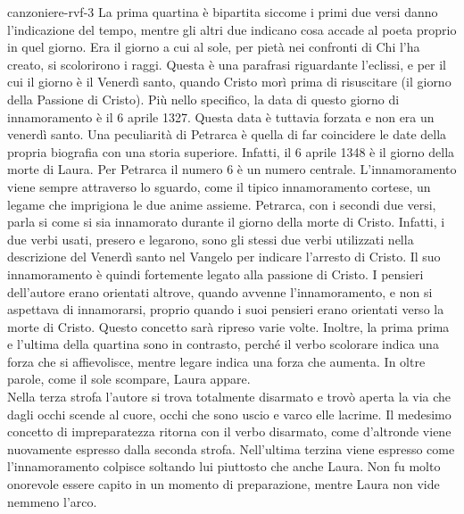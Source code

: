 \documentclass[preview]{standalone}
\begin{document}
\begin{snippet}{canzoniere-rvf-3}
    La prima quartina è bipartita siccome i primi due versi danno l'indicazione del tempo,
    mentre gli altri due indicano cosa accade al poeta proprio in quel giorno.
    Era il giorno a cui al sole, per pietà nei confronti di Chi l'ha creato, si scolorirono i raggi.
    Questa è una parafrasi riguardante l'eclissi, e per il cui il giorno è il Venerdì santo, quando
    Cristo morì prima di risuscitare (il giorno della Passione di Cristo).
    Più nello specifico, la data di questo giorno di innamoramento è il 6 aprile 1327.
    Questa data è tuttavia forzata e non era un venerdì santo.
    Una peculiarità di Petrarca è quella di far coincidere le date della propria biografia
    con una storia superiore. Infatti, il 6 aprile 1348 è il giorno della morte di Laura.
    Per Petrarca il numero 6 è un numero centrale.
    L'innamoramento viene sempre attraverso lo sguardo, come il tipico innamoramento cortese,
    un legame che imprigiona le due anime assieme.
    Petrarca, con i secondi due versi, parla si come si sia innamorato durante il giorno della morte di Cristo.
    Infatti, i due verbi usati, presero e legarono, sono gli stessi due verbi utilizzati nella descrizione
    del Venerdì santo nel Vangelo per indicare l'arresto di Cristo.
    Il suo innamoramento è quindi fortemente legato alla passione di Cristo.
    I pensieri dell'autore erano orientati altrove, quando avvenne l'innamoramento, e non si aspettava
    di innamorarsi, proprio quando i suoi pensieri erano orientati verso la morte di Cristo.
    Questo concetto sarà ripreso varie volte.
    Inoltre, la prima prima e l'ultima della quartina sono in contrasto, perché il verbo scolorare
    indica una forza che si affievolisce, mentre legare indica una forza che aumenta.
    In oltre parole, come il sole scompare, Laura appare. \\
    Nella terza strofa l'autore si trova totalmente disarmato e trovò aperta la via
    che dagli occhi scende al cuore, occhi che sono uscio e varco elle lacrime.
    Il medesimo concetto di impreparatezza ritorna con il verbo disarmato, come d'altronde viene
    nuovamente espresso dalla seconda strofa.
    Nell'ultima terzina viene espresso come
    l'innamoramento colpisce soltando lui piuttosto che anche Laura.
    Non fu molto onorevole essere capito in un momento di preparazione, mentre
    Laura non vide nemmeno l'arco.

\end{snippet}
\end{document}
